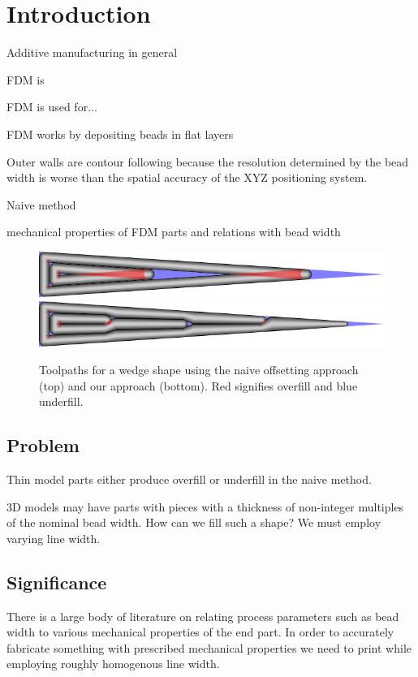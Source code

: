 \section{Introduction}
Additive manufacturing in general

FDM is

FDM is used for...

FDM works by depositing beads in flat layers

Outer walls are contour following because the resolution determined by the bead width is worse than the spatial accuracy of the XYZ positioning system.

Naive method

mechanical properties of FDM parts and relations with bead width

\begin{figure}\centering
\includegraphics[width=\columnwidth]{sources/intro/TEST_naive_pretty.png}
\includegraphics[width=\columnwidth]{sources/intro/TEST_Distributed_pretty.png}
\caption{
Toolpaths for a wedge shape using the naive offsetting approach (top) and our approach (bottom).
Red signifies overfill and blue underfill.
}
\label{intro_wedge}
\end{figure}



\subsection{Problem}
Thin model parts either produce overfill or underfill in the naive method.

3D models may have parts with pieces with a thickness of non-integer multiples of the nominal bead width.
How can we fill such a shape?
We must employ varying line width.



\subsection{Significance}

There is a large body of literature on relating process parameters such as bead width to various mechanical properties of the end part.
In order to accurately fabricate something with prescribed mechanical properties we need to print while employing roughly homogenous line width.

